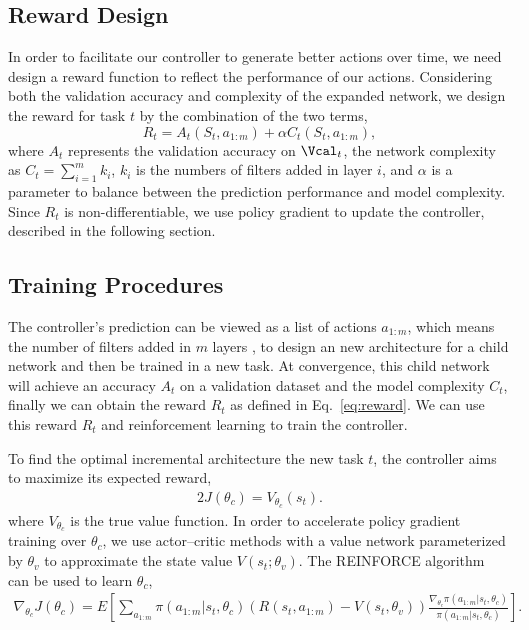 \documentclass{article}
\begin{document}
\subsection{Reward Design}
\label{sec:reward}
In order to facilitate  our controller to generate better actions over time, we need design a reward function to reflect the performance of our actions.  Considering both the validation accuracy and complexity of the expanded network, we design the reward for task $t$ by the combination of the two terms,
\begin{equation}
R_t = A_t(S_t,a_{1:m})  + \alpha C_t(S_t,a_{1:m}), \label{eq:reward}
\end{equation}
where $A_t$ represents the validation accuracy on $\Vcal_t$, the network complexity as $C_t = \sum\limits_{i=1}^m k_i$, $k_i$ is the numbers of filters added in layer $i$, and $\alpha$ is a parameter to balance between the prediction performance and model complexity.
Since $R_t$ is non-differentiable, we use policy gradient to update the controller, described in the following section.

\subsection{Training Procedures}

The controller's prediction can be viewed as a list of actions $a_{1:m}$, which means the number of filters added in $m$ layers , to design an
new architecture for a child network and then be trained in a new task. At convergence, this child network will achieve an accuracy $A_t$ on
a validation dataset and the model complexity $C_t$, finally we can obtain the reward $R_t$ as defined in Eq.~\eqref{eq:reward}. We can use this reward $R_t$ and reinforcement learning
to train the controller.

To find the optimal incremental architecture the new task $t$, the controller aims  to maximize its expected reward,
\begin{alignat}{2}
J(\theta_c)=V_{\theta_c}(s_t).
\end{alignat}
where $V_{\theta_c}$ is the true value function.
 In order to accelerate policy gradient training over $\theta_c$, we use actor–critic methods with
a value network parameterized by $\theta_v$ to approximate the state value $V(s_t; \theta_v)$.   The REINFORCE algorithm~\cite{william1} can be used to learn $\theta_c$,
\begin{align}
\label{reinforce1}
\nabla_{\theta_c}J(\theta_c) = E \left[ \sum \limits_{a_{1:m}} \pi(a_{1:m}|s_t,\theta_c)(R(s_t,a_{1:m})-V(s_t,\theta_v))\frac{\nabla_{\theta_c}\pi(a_{1:m}|s_t,\theta_c)}{\pi(a_{1:m}|s_t,\theta_c)} \right].
\end{align}
\end{document}

